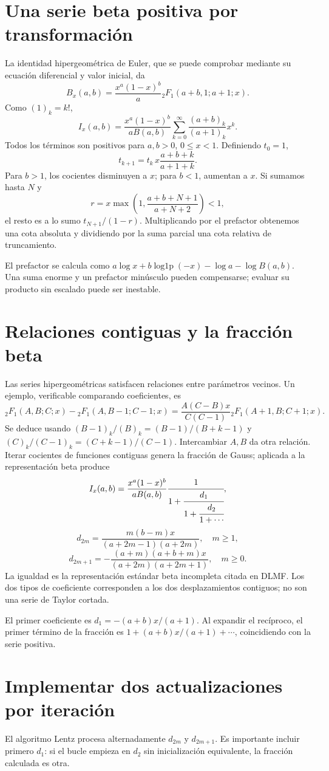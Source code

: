 \documentclass[11pt,a4paper]{article}
\theoremstyle{definition}
\DeclareMathOperator{\logonep}{log1p}
\begin{document}
\section{Una serie beta positiva por transformación}
La identidad hipergeométrica de Euler, que se puede comprobar mediante su ecuación diferencial y valor inicial, da
\[
B_x(a,b)=\frac{x^a(1-x)^b}a
{}_2F_1(a+b,1;a+1;x).
\]
Como $(1)_k=k!$,
\[
I_x(a,b)=\frac{x^a(1-x)^b}{aB(a,b)}
\sum_{k=0}^\infty\frac{(a+b)_k}{(a+1)_k}x^k.
\]
Todos los términos son positivos para $a,b>0$, $0\le x<1$. Definiendo $t_0=1$,
\[
t_{k+1}=t_k\,x\frac{a+b+k}{a+1+k}.
\]
Para $b>1$, los cocientes disminuyen a $x$; para $b<1$, aumentan a $x$. Si sumamos hasta $N$ y
\[
r=x\max\left(1,\frac{a+b+N+1}{a+N+2}\right)<1,
\]
el resto es a lo sumo $t_{N+1}/(1-r)$. Multiplicando por el prefactor obtenemos una cota absoluta y dividiendo por la suma parcial una cota relativa de truncamiento.

El prefactor se calcula como
$a\log x+b\logonep(-x)-\log a-\log B(a,b)$.
Una suma enorme y un prefactor minúsculo pueden compensarse; evaluar su producto sin escalado puede ser inestable.

\section{Relaciones contiguas y la fracción beta}
Las series hipergeométricas satisfacen relaciones entre parámetros vecinos. Un ejemplo, verificable comparando coeficientes, es
\[
{}_2F_1(A,B;C;x)-{}_2F_1(A,B-1;C-1;x)
=\frac{A(C-B)x}{C(C-1)}
{}_2F_1(A+1,B;C+1;x).
\]
Se deduce usando
$(B-1)_k/(B)_k=(B-1)/(B+k-1)$ y
$(C)_k/(C-1)_k=(C+k-1)/(C-1)$.
Intercambiar $A,B$ da otra relación. Iterar cocientes de funciones contiguas genera la fracción de Gauss; aplicada a la representación beta produce
\[
I_x(a,b)=\frac{x^a(1-x)^b}{aB(a,b)}
\cfrac1{1+\cfrac{d_1}{1+\cfrac{d_2}{1+\cdots}}},
\]
\[
d_{2m}=\frac{m(b-m)x}{(a+2m-1)(a+2m)},\quad m\ge1,
\]
\[
d_{2m+1}=-\frac{(a+m)(a+b+m)x}{(a+2m)(a+2m+1)},\quad m\ge0.
\]
La igualdad es la representación estándar beta incompleta citada en DLMF. Los dos tipos de coeficiente corresponden a los dos desplazamientos contiguos; no son una serie de Taylor cortada.

El primer coeficiente es $d_1=-(a+b)x/(a+1)$. Al expandir el recíproco, el primer término de la fracción es $1+(a+b)x/(a+1)+\cdots$, coincidiendo con la serie positiva.

\section{Implementar dos actualizaciones por iteración}
El algoritmo Lentz procesa alternadamente $d_{2m}$ y $d_{2m+1}$. Es importante incluir primero $d_1$: si el bucle empieza en $d_2$ sin inicialización equivalente, la fracción calculada es otra.
\end{document}
